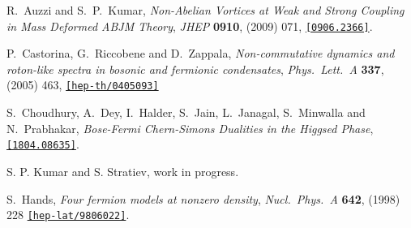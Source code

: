 \begin{thebibliography}{99}
  R.~Auzzi and S.~P.~Kumar,
  {\it Non-Abelian Vortices at Weak and Strong Coupling in Mass Deformed ABJM Theory}, 
  {\it JHEP} {\bf 0910}, (2009) 071,
 \href{https://arxiv.org/abs/0906.2366}{\tt[0906.2366]}.

  P.~Castorina, G.~Riccobene and D.~Zappala,
  {\it Non-commutative dynamics and roton-like spectra in bosonic and fermionic condensates}, 
  {\it Phys.\ Lett.\ A} {\bf 337}, (2005) 463, 
 \href{https://arxiv.org/abs/hep-th/0405093}{\tt[hep-th/0405093]}

  S.~Choudhury, A.~Dey, I.~Halder, S.~Jain, L.~Janagal, S.~Minwalla and N.~Prabhakar,
  {\it Bose-Fermi Chern-Simons Dualities in the Higgsed Phase},
  \href{https://arxiv.org/abs/1804.08635}{\tt[1804.08635]}.
  
S. P. Kumar and S. Stratiev, work in progress.

  S.~Hands,
  {\it Four fermion models at nonzero density},
  {\it Nucl.\ Phys.\ A} {\bf 642}, (1998) 228
  \href{https://arxiv.org/abs/hep-lat/9806022}{\tt[hep-lat/9806022]}.

 \end{thebibliography}
